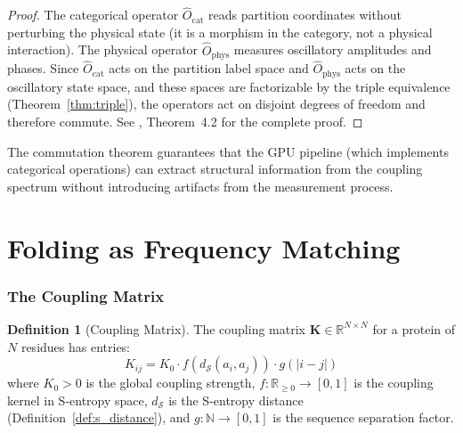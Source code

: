 \documentclass[11pt,twocolumn,a4paper]{article}
\theoremstyle{definition}
\newtheorem{definition}[theorem]{Definition}
\theoremstyle{remark}
\newcommand{\Sspace}{\mathcal{S}}
\newcommand{\R}{\mathbb{R}}
\newcommand{\N}{\mathbb{N}}
\newcommand{\coupmat}{\mathbf{K}}
\begin{document}
\begin{proof}
The categorical operator $\hat{O}_{\mathrm{cat}}$ reads partition coordinates without perturbing the physical state (it is a morphism in the category, not a physical interaction). The physical operator $\hat{O}_{\mathrm{phys}}$ measures oscillatory amplitudes and phases. Since $\hat{O}_{\mathrm{cat}}$ acts on the partition label space and $\hat{O}_{\mathrm{phys}}$ acts on the oscillatory state space, and these spaces are factorizable by the triple equivalence (Theorem~\ref{thm:triple}), the operators act on disjoint degrees of freedom and therefore commute. See \citet{sachikonye2025_partition}, Theorem~4.2 for the complete proof.
\end{proof}

The commutation theorem guarantees that the GPU pipeline (which implements categorical operations) can extract structural information from the coupling spectrum without introducing artifacts from the measurement process.

\part{Folding as Frequency Matching}

\section{The Coupling Matrix}
\label{sec:coupling_matrix}

\begin{definition}[Coupling Matrix]
\label{def:coupling_matrix}
The coupling matrix $\coupmat \in \R^{N \times N}$ for a protein of $N$ residues has entries:
\begin{equation}
\label{eq:coupling_matrix}
K_{ij} = K_0 \cdot f\!\left(d_{\Sspace}(a_i, a_j)\right) \cdot g(|i - j|)
\end{equation}
where $K_0 > 0$ is the global coupling strength, $f: \R_{\geq 0} \to [0,1]$ is the coupling kernel in S-entropy space, $d_{\Sspace}$ is the S-entropy distance (Definition~\ref{def:s_distance}), and $g: \N \to [0,1]$ is the sequence separation factor.
\end{definition}
\end{document}
